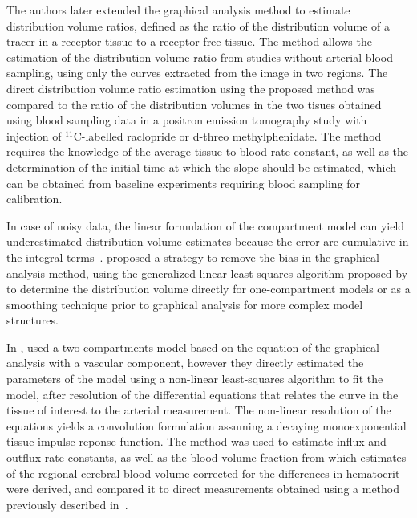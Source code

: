 The authors later extended the graphical analysis method to estimate distribution volume ratios, defined as the ratio of the distribution volume of a tracer in a receptor tissue to a receptor-free tissue. 
The method allows the estimation of the distribution volume ratio from studies without arterial blood sampling, using only the curves extracted from the image in two regions. 
The direct distribution volume ratio estimation using the proposed method was compared to the ratio of the distribution volumes in the two tisues obtained using blood sampling data in a positron emission tomography study with injection of $^{11}$C-labelled raclopride or d-threo­ methylphenidate.
The method requires the knowledge of the average tissue to blood rate constant, as well as the determination of the initial time at which the slope should be estimated, which can be obtained from baseline experiments requiring blood sampling for calibration.

In case of noisy data, the linear formulation of the compartment model can yield underestimated distribution volume estimates because the error are cumulative in the integral terms~\cite{Feng:1993cq}.
\citet{Logan:2001ip} proposed a strategy to remove the bias in the graphical analysis method, using the generalized linear least-squares algorithm proposed by \citet{Feng:1996ic} to determine the distribution volume directly for one-compartment models or as a smoothing technique prior to graphical analysis for more complex model structures.

In \citeyear{Hawkins:1984da}, \citet{Hawkins:1984da} used a two compartments model based on the equation of the graphical analysis with a vascular component, however they directly estimated the parameters of the model using a non-linear least-squares algorithm to fit the model, after resolution of the differential equations that relates the curve in the tissue of interest to the arterial measurement.
The non-linear resolution of the equations yields a convolution formulation assuming a decaying monoexponential tissue impulse reponse function.
The method was used to estimate influx and outflux rate constants, as well as the blood volume fraction from which estimates of the regional cerebral blood volume corrected for the differences in hematocrit were derived, and compared it to direct measurements obtained using a method previously described in~\cite{Phelps:1979tl}.

